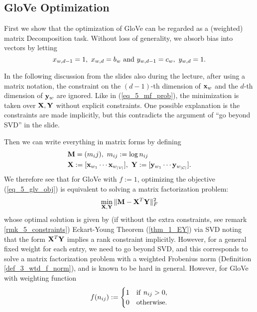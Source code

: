 \documentclass[../book-template.tex]{subfiles}
\begin{document}
\subsection{GloVe Optimization}
First we show that the optimization of GloVe can be regarded as a (weighted) matrix Decomposition task. Without loss of generality, we absorb bias into vectors by letting
\begin{equation*}
	x_{w,d-1}=1,\ x_{w,d}=b_w\ {\rm and}\ y_{w,d-1}=c_w,\ y_{w,d}=1.
\end{equation*}
\begin{remark}\label{rmk_5_constraints}
	In the following discussion from the slides also during the lecture, after using a matrix notation, the constraint on the $(d-1)$-th dimension of ${\bf x}_w$ and the $d$-th dimension of ${\bf y}_w$ are ignored. Like in (\ref{eq_5_mf_prob}), the minimization is taken over ${\bf X,Y}$ without explicit constraints. One possible explanation is the constraints are made implicitly, but this contradicts the argument of ``go beyond SVD'' in the slide. 
\end{remark}
Then we can write everything in matrix forms by defining
\begin{align*}
	&{\bf M}=(m_ij),\ m_{ij}:=\log n_{ij}\\
	&{\bf X}:=[{\bf x}_{w_1}\cdots{\bf x}_{w_{|\mathcal{V}|}}],\ {\bf Y}:=[{\bf y}_{w_1}\cdots {\bf y}_{w_{|\mathcal{C}|}}].
\end{align*}
We therefore see that for GloVe with $f:=1$, optimizing the objective (\ref{eq_5_glv_obj}) is equivalent to solving a matrix factorization problem:
\begin{equation}\label{eq_5_mf_prob}
	\min_{\bf X,Y}\|{\bf M}-{\bf X}^T{\bf Y}\|^2_F
\end{equation}
whose optimal solution is given by (if without the extra constraints, see remark \ref{rmk_5_constraints}) Eckart-Young Theorem (\ref{thm_1_EY}) via SVD noting that the form ${\bf X}^T{\bf Y}$ implies a rank constraint implicitly. However, for a general fixed weight for each entry, we need to go beyond SVD, and this corresponds to solve a matrix factorization problem with a weighted Frobenius norm (Definition \ref{def_3_wtd_f_norm}), and is known to be hard in general. However, for GloVe with weighting function 
\begin{equation*}
	f(n_{ij}):=\begin{cases}
	1 & {\rm if}\ n_{ij}>0,\\
	0 & {\rm otherwise}.
	\end{cases}
\end{equation*}
\end{document}
